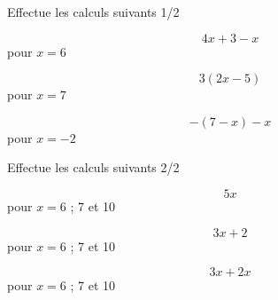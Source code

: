 \begin{frame}{Effectue les calculs suivants 1/2}
\begin{multicols}{3}
        $$4x+3-x$$ pour $x=6$
    
        $$3(2x-5)$$ pour $x=7$
    
        $$-(7-x)-x$$ pour $x=-2$
\end{multicols}
\end{frame}

\begin{frame}{Effectue les calculs suivants 2/2}
\begin{multicols}{3}
        $$5x$$ pour $x=6$ ; 7 et 10
    
        $$3x+2$$ pour $x=6$ ; 7 et 10
    
        $$3x+2x$$ pour $x=6$ ; 7 et 10
\end{multicols}
\end{frame}